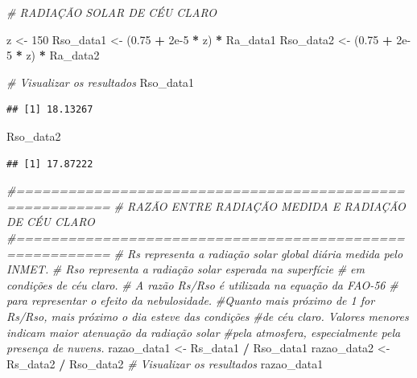 \documentclass[
]{article}
\newenvironment{Shaded}{\begin{snugshade}}{\end{snugshade}}
\newcommand{\CommentTok}[1]{\textcolor[rgb]{0.56,0.35,0.01}{\textit{#1}}}
\newcommand{\DecValTok}[1]{\textcolor[rgb]{0.00,0.00,0.81}{#1}}
\newcommand{\FloatTok}[1]{\textcolor[rgb]{0.00,0.00,0.81}{#1}}
\newcommand{\NormalTok}[1]{#1}
\newcommand{\OtherTok}[1]{\textcolor[rgb]{0.56,0.35,0.01}{#1}}
\newcommand{\SpecialCharTok}[1]{\textcolor[rgb]{0.81,0.36,0.00}{\textbf{#1}}}
\begin{document}
\begin{Shaded}
\begin{Highlighting}[]
\CommentTok{\# RADIAÇÃO SOLAR DE CÉU CLARO}

\NormalTok{z }\OtherTok{\textless{}{-}} \DecValTok{150}
\NormalTok{Rso\_data1 }\OtherTok{\textless{}{-}}\NormalTok{ (}\FloatTok{0.75} \SpecialCharTok{+} \FloatTok{2e{-}5} \SpecialCharTok{*}\NormalTok{ z) }\SpecialCharTok{*}\NormalTok{ Ra\_data1}
\NormalTok{Rso\_data2 }\OtherTok{\textless{}{-}}\NormalTok{ (}\FloatTok{0.75} \SpecialCharTok{+} \FloatTok{2e{-}5} \SpecialCharTok{*}\NormalTok{ z) }\SpecialCharTok{*}\NormalTok{ Ra\_data2}

\CommentTok{\# Visualizar os resultados}
\NormalTok{Rso\_data1}
\end{Highlighting}
\end{Shaded}

\begin{verbatim}
## [1] 18.13267
\end{verbatim}

\begin{Shaded}
\begin{Highlighting}[]
\NormalTok{Rso\_data2}
\end{Highlighting}
\end{Shaded}

\begin{verbatim}
## [1] 17.87222
\end{verbatim}

\begin{Shaded}
\begin{Highlighting}[]
\CommentTok{\#=========================================================}
\CommentTok{\# RAZÃO ENTRE RADIAÇÃO MEDIDA E RADIAÇÃO DE CÉU CLARO}
\CommentTok{\#=========================================================}
\CommentTok{\# Rs representa a radiação solar global diária medida pelo INMET.}
\CommentTok{\# Rso representa a radiação solar esperada na superfície}
\CommentTok{\# em condições de céu claro.}
\CommentTok{\# A razão Rs/Rso é utilizada na equação da FAO{-}56}
\CommentTok{\# para representar o efeito da nebulosidade.}
\CommentTok{\#Quanto mais próximo de 1 for Rs/Rso, mais próximo o dia esteve das condições}
\CommentTok{\#de céu claro. Valores menores indicam maior atenuação da radiação solar }
\CommentTok{\#pela atmosfera, especialmente pela presença de nuvens.}
\NormalTok{razao\_data1 }\OtherTok{\textless{}{-}}\NormalTok{ Rs\_data1 }\SpecialCharTok{/}\NormalTok{ Rso\_data1}
\NormalTok{razao\_data2 }\OtherTok{\textless{}{-}}\NormalTok{ Rs\_data2 }\SpecialCharTok{/}\NormalTok{ Rso\_data2}
\CommentTok{\# Visualizar os resultados}
\NormalTok{razao\_data1}
\end{Highlighting}
\end{Shaded}
\end{document}
